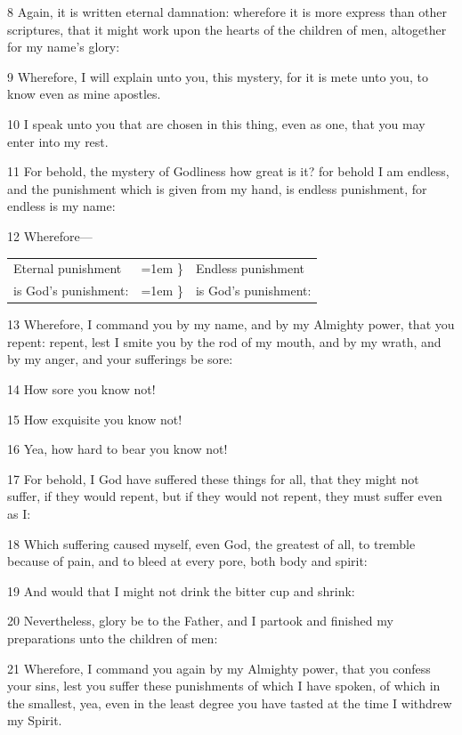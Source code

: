 				8 Again, it is written eternal damnation: wherefore it is more express than other scriptures, that it might work upon the hearts of the children of men, altogether for my name's glory:

				9 Wherefore, I will explain unto you, this mystery, for it is mete unto you, to know even as mine apostles.

				10 I speak unto you that are chosen in this thing, even as one, that you may enter into my rest.

				11 For behold, the mystery of Godliness how great is it? for behold I am endless, and the punishment which is given from my hand, is endless punishment, for endless is my name:

				12 Wherefore---
				
				\begin{tabular}{p{1.5in}>{\hangindent=1em}p{0.25in}p{3.0in}<{\raggedright}}
				Eternal punishment & \} & Endless punishment \\
				is God's punishment: & \} & is God's punishment:
				\end{tabular}
				
				13 Wherefore, I command you by my name, and by my Almighty power, that you repent: repent, lest I smite you by the rod of my mouth, and by my wrath, and by my anger, and your sufferings be sore:

				14 How sore you know not!

				15 How exquisite you know not!

				16 Yea, how hard to bear you know not!

				17 For behold, I God have suffered these things for all, that they might not suffer, if they would repent, but if they would not repent, they must suffer even as I:

				18 Which suffering caused myself, even God, the greatest of all, to tremble because of pain, and to bleed at every pore, both body and spirit:

				19 And would that I might not drink the bitter cup and shrink:

				20 Nevertheless, glory be to the Father, and I partook and finished my preparations unto the children of men:

				21 Wherefore, I command you again by my Almighty power, that you confess your sins, lest you suffer these punishments of which I have spoken, of which in the smallest, yea, even in the least degree you have tasted at the time I withdrew my Spirit.

